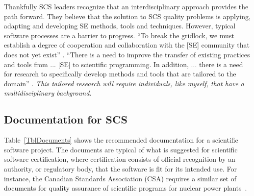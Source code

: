 \documentclass[12pt]{article}
\begin{document}
Thankfully SCS leaders recognize that an interdisciplinary approach provides the
path forward.  They believe that the solution to SCS quality problems is
applying, adapting and developing SE methods, tools and techniques.  However,
typical software processes are a barrier to progress.  ``To break the gridlock,
we must establish a degree of cooperation and collaboration with the [SE]
community that does not yet exist'' \citep{FaulkEtAl2009}.  ``There is a need to
improve the transfer of existing practices and tools from ... [SE] to scientific
programming. In addition, ... there is a need for research to specifically
develop methods and tools that are tailored to the domain'' \citep{Storer2017}.
\emph{This tailored research will require individuals, like myself, that have a
  multidisciplinary background.}

\subsection{Documentation for SCS}

Table~\ref{TblDocuments} shows the recommended documentation for a scientific
software project.  The documents are typical of what is suggested for scientific
software certification, where certification consists of official recognition by
an authority, or regulatory body, that the software is fit for its intended use.
For instance, the Canadian Standards Association (CSA) requires a similar set of
documents for quality assurance of scientific programs for nuclear power
plants~\cite{CSA1999}.
\end{document}
